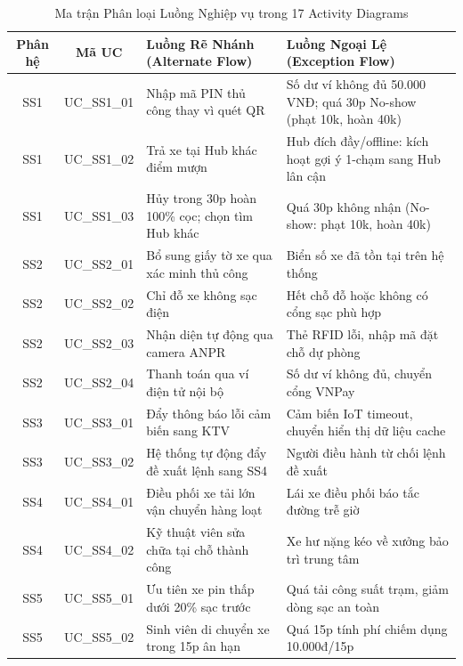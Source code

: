 \documentclass[12pt,a4paper]{article}
\begin{document}
\begin{table}[H]
    \centering
    \small
    \renewcommand{\arraystretch}{1.2}
    \caption{Ma trận Phân loại Luồng Nghiệp vụ trong 17 Activity Diagrams}
    \label{tab:act-matrix}
    \begin{tabularx}{\textwidth}{|c|c|X|X|}
        \hline
        \textbf{Phân hệ} & \textbf{Mã UC} & \textbf{Luồng Rẽ Nhánh (Alternate Flow)} & \textbf{Luồng Ngoại Lệ (Exception Flow)} \\
        \hline
        SS1 & UC\_SS1\_01 & Nhập mã PIN thủ công thay vì quét QR & Số dư ví không đủ 50.000 VNĐ; quá 30p No-show (phạt 10k, hoàn 40k) \\
        SS1 & UC\_SS1\_02 & Trả xe tại Hub khác điểm mượn & Hub đích đầy/offline: kích hoạt gợi ý 1-chạm sang Hub lân cận \\
        SS1 & UC\_SS1\_03 & Hủy trong 30p hoàn 100\% cọc; chọn tìm Hub khác & Quá 30p không nhận (No-show: phạt 10k, hoàn 40k) \\
        \hline
        SS2 & UC\_SS2\_01 & Bổ sung giấy tờ xe qua xác minh thủ công & Biển số xe đã tồn tại trên hệ thống \\
        SS2 & UC\_SS2\_02 & Chỉ đỗ xe không sạc điện & Hết chỗ đỗ hoặc không có cổng sạc phù hợp \\
        SS2 & UC\_SS2\_03 & Nhận diện tự động qua camera ANPR & Thẻ RFID lỗi, nhập mã đặt chỗ dự phòng \\
        SS2 & UC\_SS2\_04 & Thanh toán qua ví điện tử nội bộ & Số dư ví không đủ, chuyển cổng VNPay \\
        \hline
        SS3 & UC\_SS3\_01 & Đẩy thông báo lỗi cảm biến sang KTV & Cảm biến IoT timeout, chuyển hiển thị dữ liệu cache \\
        SS3 & UC\_SS3\_02 & Hệ thống tự động đẩy đề xuất lệnh sang SS4 & Người điều hành từ chối lệnh đề xuất \\
        \hline
        SS4 & UC\_SS4\_01 & Điều phối xe tải lớn vận chuyển hàng loạt & Lái xe điều phối báo tắc đường trễ giờ \\
        SS4 & UC\_SS4\_02 & Kỹ thuật viên sửa chữa tại chỗ thành công & Xe hư nặng kéo về xưởng bảo trì trung tâm \\
        \hline
        SS5 & UC\_SS5\_01 & Ưu tiên xe pin thấp dưới 20\% sạc trước & Quá tải công suất trạm, giảm dòng sạc an toàn \\
        SS5 & UC\_SS5\_02 & Sinh viên di chuyển xe trong 15p ân hạn & Quá 15p tính phí chiếm dụng 10.000đ/15p \\
        \hline

\end{tabularx}
\end{table}
\end{document}
